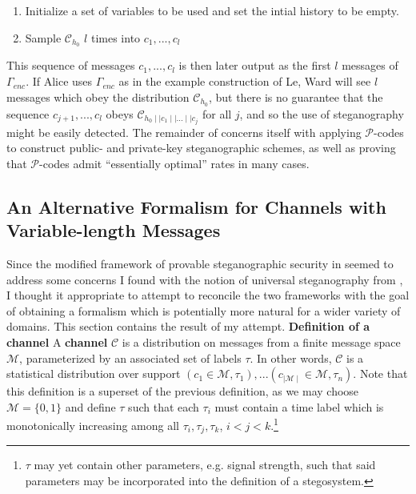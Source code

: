 \documentclass{article}
\begin{document}
 \begin{enumerate}
 \item{Initialize a set of variables to be used and set the intial history to be empty.}
 \item{Sample $\mathcal{C}_{h_0}$ $l$ times into $c_1,...,c_l$}
 \end{enumerate}

 \noindent This sequence of messages $c_1,...,c_l$ is then later output as the first $l$ messages of $\Gamma_{enc}$.  If Alice uses 
 $\Gamma_{enc}$ as in the example construction of Le, Ward will see $l$ messages which obey the distribution $\mathcal{C}_{h_0}$, but there is 
 no guarantee that the sequence $c_{j+1},...,c_l$ obeys $\mathcal{C}_{h_0 \mid \mid c_1 \mid \mid ... \mid \mid c_j}$ for all $j$, and so the use 
 of steganography might be easily detected.
\newline\newline
The remainder of \cite{BadSteg} concerns itself with applying $\mathcal{P}$-codes to construct public- and private-key steganographic schemes,
as well as proving that $\mathcal{P}$-codes admit ``essentially optimal'' rates in many cases. 

\subsection{An Alternative Formalism for Channels with Variable-length Messages}

Since the modified framework of provable steganographic security in \cite{BadSteg} seemed to address some concerns I found with the notion of 
universal steganography from \cite{BiglouPSS}, I thought it appropriate to attempt to reconcile the two frameworks with the goal of 
obtaining a formalism which is potentially more natural for a wider variety of domains.  This section contains the result of my attempt.
\newline\newline
\noindent \textbf{Definition of a channel } A \textbf{channel} $\mathcal{C}$ is a distribution on messages from a finite message space 
$\mathcal{M}$, parameterized by an associated set of labels $\tau$.  In other words, $\mathcal{C}$ is a statistical distribution over 
support $(c_1 \in \mathcal{M}, \tau_1),...(c_{\mid \mathcal{M} \mid} \in \mathcal{M}, \tau_n)$.  Note that this definition is a superset 
of the previous definition, as we may choose $\mathcal{M} = \{0,1\}$ and define $\tau$ such that each $\tau_i$ must contain a time label 
which is monotonically increasing among all $\tau_i, \tau_j, \tau_k$, $i < j < k$.\footnote{$\tau$ may yet contain other parameters, e.g. 
signal strength, such that said parameters may be incorporated into the definition of a stegosystem.}
\end{document}
